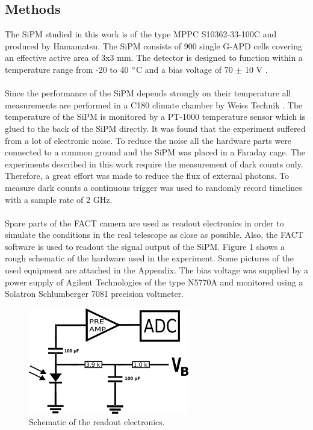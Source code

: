 \documentclass[10pt,a4paper]{article}
\begin{document}
\begin{multicols}{2}
\section{Methods}
The SiPM studied in this work is of the type MPPC S10362-33-100C and produced by Hamamatsu. The SiPM consists of 900 single G-APD cells covering an effective active area of 3x3 mm. The detector is designed to function within a temperature range from -20 to 40 $\degree$C and a bias voltage of 70 $\pm$ 10 V \cite{diode}. \\ \\  \noindent
Since the performance of the SiPM depends strongly on their temperature all measurements are performed in a C180 climate chamber by Weiss Technik \cite{schrank}. The temperature of the SiPM is monitored by a PT-1000 temperature sensor which is glued to the back of the SiPM directly. It was found that the experiment suffered from a lot of electronic noise. To reduce the noise all the hardware parts were connected to a common ground and the SiPM was placed in a Faraday cage. The experiments described in this work require the measurement of dark counts only. Therefore, a great effort was made to reduce the flux of external photons. To measure dark counts a continuous trigger was used to randomly record timelines with a sample rate of 2 GHz. \\ \\  \noindent
Spare parts of the FACT camera are used as readout electronics in order to simulate the conditions in the real telescope as close as possible. Also, the FACT software is used to readout the signal output of the SiPM. Figure 1 shows a rough schematic of the hardware used in the experiment. Some pictures of the used equipment are attached in the Appendix. The bias voltage was supplied by a power supply of Agilent Technologies of the type N5770A and monitored using a Solatron Schlumberger 7081 precision voltmeter.
\end{multicols}
\begin{figure}
\centering
\includegraphics[width= 7cm]{circuit2}
\caption{Schematic of the readout electronics.}
\label{fig1} 
\end{figure}
\end{document}
